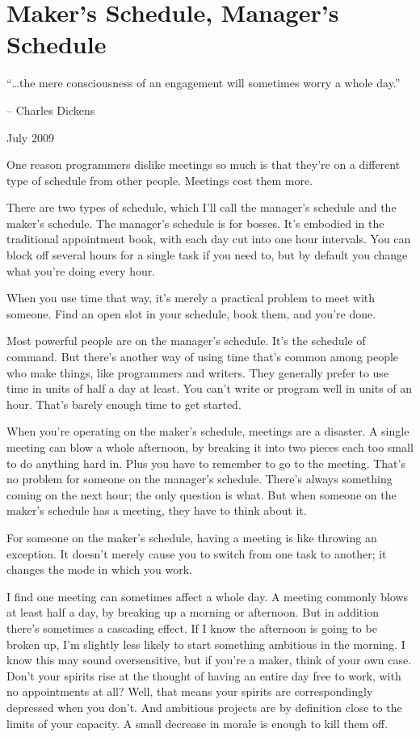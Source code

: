 \chapter{Maker's Schedule, Manager's Schedule }

``\ldots the mere consciousness of an engagement will sometimes worry a
whole day.''

-- Charles Dickens

July 2009

One reason programmers dislike meetings so much is that they're on a
different type of schedule from other people. Meetings cost them more.

There are two types of schedule, which I'll call the manager's schedule
and the maker's schedule. The manager's schedule is for bosses. It's
embodied in the traditional appointment book, with each day cut into one
hour intervals. You can block off several hours for a single task if you
need to, but by default you change what you're doing every hour.

When you use time that way, it's merely a practical problem to meet with
someone. Find an open slot in your schedule, book them, and you're done.

Most powerful people are on the manager's schedule. It's the schedule of
command. But there's another way of using time that's common among
people who make things, like programmers and writers. They generally
prefer to use time in units of half a day at least. You can't write or
program well in units of an hour. That's barely enough time to get
started.

When you're operating on the maker's schedule, meetings are a disaster.
A single meeting can blow a whole afternoon, by breaking it into two
pieces each too small to do anything hard in. Plus you have to remember
to go to the meeting. That's no problem for someone on the manager's
schedule. There's always something coming on the next hour; the only
question is what. But when someone on the maker's schedule has a
meeting, they have to think about it.

For someone on the maker's schedule, having a meeting is like throwing
an exception. It doesn't merely cause you to switch from one task to
another; it changes the mode in which you work.

I find one meeting can sometimes affect a whole day. A meeting commonly
blows at least half a day, by breaking up a morning or afternoon. But in
addition there's sometimes a cascading effect. If I know the afternoon
is going to be broken up, I'm slightly less likely to start something
ambitious in the morning. I know this may sound oversensitive, but if
you're a maker, think of your own case. Don't your spirits rise at the
thought of having an entire day free to work, with no appointments at
all? Well, that means your spirits are correspondingly depressed when
you don't. And ambitious projects are by definition close to the limits
of your capacity. A small decrease in morale is enough to kill them off.

